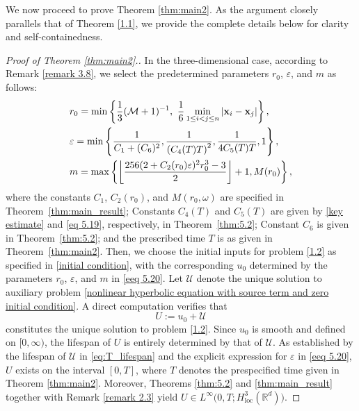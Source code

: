 \documentclass[11pt,reqno,oneside]{amsart}
\numberwithin{equation}{section}
\theoremstyle{definition}
\theoremstyle{remark}
\numberwithin{equation}{section}
\begin{document}
	We now proceed to prove Theorem \ref{thm:main2}. As the argument closely parallels that of Theorem \ref{1.1}, we provide the complete details below for clarity and self-containedness.
	\begin{proof}[Proof of Theorem \ref{thm:main2}.]\label{proof 1.2}
		In the three-dimensional case, according to Remark \ref{remark 3.8}, we select the predetermined parameters $r_0$, $\varepsilon$, and $m$ as follows:
		\begin{equation}\label{eeq 5.20}
			\begin{aligned}
				&\hfill r_0 = \min\left\{\frac{1}{3}(\mathcal{M} + 1)^{-1},\ \frac{1}{6}\min_{1 \leq i < j \leq n} |\mathbf{x}_i - \mathbf{x}_j|\right\}, \\
				&\hfill \varepsilon = \min\left\{\frac{1}{C_1 + (C_6)^2},\frac{1}{\left(C_4(T)T\right)^2},\frac{1}{4C_5(T)T},1\right\}, \\
				&\hfill m = \max\left\{ \left\lfloor \frac{256(2+C_2(r_0)\varepsilon)^2r_{0}^{3}-3}{2} \right\rfloor + 1,  M(r_0) \right\},
			\end{aligned}
		\end{equation}
		where the constants $C_1$, $C_2(r_0)$, and $M(r_0,\omega)$ are specified in Theorem~\ref{thm:main_result};  Constants $C_4(T)$ and $C_5(T)$ are given by \eqref{key estimate} and \eqref{eq 5.19}, respectively, in Theorem~\ref{thm:5.2};  Constant $C_6$ is given in Theorem~\ref{thm:5.2}; and the prescribed time $T$ is as given in Theorem~\ref{thm:main2}. Then, we choose the initial inputs for problem \eqref{1.2} as specified in \eqref{initial condition}, with the corresponding $u_0$ determined by the parameters $r_0$, $\varepsilon$, and $m$ in \eqref{eeq 5.20}. Let $\mathscr{U}$ denote the unique solution to auxiliary problem \eqref{nonlinear hyperbolic equation with source term and zero initial condition}. A direct computation verifies that
		\begin{equation}\label{eq 5.21}
			U := u_0 + \mathscr{U}
		\end{equation}
		constitutes the unique solution to problem \eqref{1.2}. Since $u_0$ is smooth and defined on $[0,\infty)$, the lifespan of $U$ is entirely determined by that of $\mathscr{U}$. As established by the lifespan of $\mathscr{U}$ in \eqref{eq:T_lifespan} and the explicit expression for $\varepsilon$ in \eqref{eeq 5.20}, $U$ exists on the interval $[0,T]$, where $T$ denotes the prespecified time  given in Theorem \ref{thm:main2}. Moreover, Theorems \ref{thm:5.2} and \ref{thm:main_result} together with Remark \ref{remark 2.3} yield $U \in L^{\infty}\big(0,T;H^{3}_{\text{loc}}(\mathbb{R}^d)\big)$.
		

\end{proof}
\end{document}
